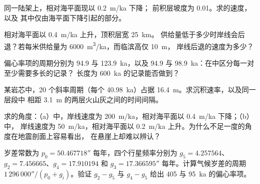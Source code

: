 \begin{exercise}[$\star\star$]\label{exo:b3:sequence-stratigraphy:6}
同一陆架上，相对海平面现以 \qty{0.2}{m/ka} 下降；
前积层坡度为 0.01。求的速度，以及
其中仅由海平面下降引起的部分。
\end{exercise}

\begin{exercise}[$\star\star$]\label{exo:b3:sequence-stratigraphy:7}
相对海平面以 \qty{0.4}{m/ka} 上升，顶积层宽 \qty{25}{km}。
供给量低于多少时岸线会后退？若每米供给量为
\qty{6000}{m^3/ka}，而临滨高仅 \qty{10}{m}，
岸线后退的速度为多少？
\end{exercise}

\begin{exercise}[$\star\star$]\label{exo:b3:sequence-stratigraphy:8}
偏心率项的周期分别为 94.9 与 \qty{123.9}{ka}，以及 94.9 与
\qty{98.9}{ka}：在中区分每一对至少需要多长的记录？
长度为 \qty{600}{ka} 的记录能否做到？
\end{exercise}

\begin{exercise}[$\star\star$]\label{exo:b3:sequence-stratigraphy:9}
某岩芯中，20 个斜率周期（每个 \qty{40.98}{ka}）占据
\qty{16.4}{m}。求沉积速率，以及同一层段中
相距 \qty{3.1}{m} 的两层火山灰之间的时间间隔。
\end{exercise}

\begin{exercise}[$\star\star\star$]\label{exo:b3:sequence-stratigraphy:10}
求的角度：（a）中，岸线速度为
\qty{200}{m/ka}，相对海平面以 \qty{0.4}{m/ka} 下降；（b）中，
岸线速度为 \qty{50}{m/ka}，相对海平面以
\qty{0.2}{m/ka} 上升。为什么不足一度的角度在地震剖面上容易看出，
在悬崖上却难以辨认？
\end{exercise}

\begin{exercise}[$\star\star\star$]\label{exo:b3:sequence-stratigraphy:11}
岁差常数为 $p_0 = 50.467718''$ 每年，四个行星频率分别为
$g_5 = 4.257564$、$g_2 = 7.456665$、$g_4 = 17.910194$ 和
$g_3 = 17.366595''$ 每年。计算气候岁差的周期
$1\,296\,000''/(p_0 + g_i)$。验证 $g_2 - g_5$ 与 $g_4 - g_5$ 给出
405 与 \qty{95}{ka} 的偏心率项。
\end{exercise}

